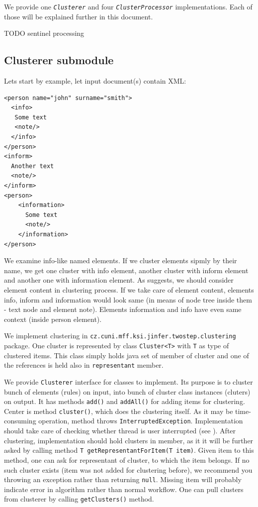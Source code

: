 \documentclass[a4paper,10pt,oneside]{article}
\newcommand{\code}[1]{\texttt{#1}}
\newcommand{\jmodule}[1]{\texttt{\textsl{#1}}}
\begin{document}
We provide one \jmodule{Clusterer} and four \jmodule{ClusterProcessor} implementations.
Each of those will be explained further in this document.

TODO sentinel processing

\subsection{Clusterer submodule}
Lets start by example, let input document(s) contain XML:
\begin{verbatim}
<person name="john" surname="smith">
  <info>
   Some text
   <note/>
  </info>
</person>
<inform>
  Another text
  <note/>
</inform>
<person>
    <information>
      Some text
      <note/>
    </information>
</person>
\end{verbatim}
We examine info-like named elements.
If we cluster elements sipmly by their name, we get one cluster with info element, another cluster with inform element and another one with information element.
As \cite{1802522} suggests, we should consider element content in clustering process.
If we take care of element content, elements info, inform and information would look same (in means of node tree inside them - text node and element note).
Elements information and info have even same context (inside person element).

We implement clustering in \code{cz.cuni.mff.ksi.jinfer.twostep.clustering} package.
One cluster is represented by class \code{Cluster<T>} with \code{T} as type of clustered items.
This class simply holds java set of member of cluster and one of the references is held also in \code{representant} member.

We provide \code{Clusterer} interface for classes to implement.
Its purpose is to cluster bunch of elements (rules) on input, into  bunch of cluster class instances (cluters) on output.
It has methods \code{add()} and \code{addAll()} for adding items for clustering.
Center is method \code{cluster()}, which does the clustering itself.
As it may be time-consuming operation, method throws \code{InterruptedException}.
Implementation should take care of checking whether thread is user interrupted (see \cite[p. 12]{arch}).
After clustering, implementation should hold clusters in member, as it it will be further asked by calling method \code{T getRepresentantForItem(T item)}.
Given item to this method, one can ask for representant of cluster, to which the item belongs.
If no such cluster exists (item was not added for clustering before), we recommend you throwing an exception rather than returning \code{null}.
Missing item will probably  indicate error in algorithm rather than normal workflow.
One can pull clusters from clusterer by calling \code{getClusters()} method.
\end{document}
